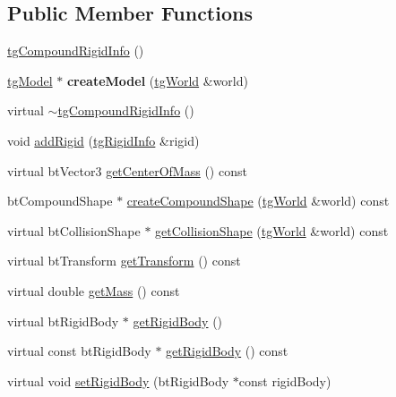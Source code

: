 \subsection*{Public Member Functions}
\begin{DoxyCompactItemize}
\item 
\hyperlink{classtg_compound_rigid_info_aa14e89fb681677147ae38737455cb960}{tg\-Compound\-Rigid\-Info} ()
\item 
\hypertarget{classtg_compound_rigid_info_a74e1206830d6374df6f32ad9cabc7f8f}{\hyperlink{classtg_model}{tg\-Model} $\ast$ {\bfseries create\-Model} (\hyperlink{classtg_world}{tg\-World} \&world)}\label{classtg_compound_rigid_info_a74e1206830d6374df6f32ad9cabc7f8f}

\item 
virtual \hyperlink{classtg_compound_rigid_info_ac926072aeeac41e063cba32014328cda}{$\sim$tg\-Compound\-Rigid\-Info} ()
\item 
void \hyperlink{classtg_compound_rigid_info_a4f908cf4b37888890667c941d7d2fddd}{add\-Rigid} (\hyperlink{classtg_rigid_info}{tg\-Rigid\-Info} \&rigid)
\item 
virtual bt\-Vector3 \hyperlink{classtg_compound_rigid_info_a16b340c7766ee6fd9397bc78170fca27}{get\-Center\-Of\-Mass} () const 
\item 
bt\-Compound\-Shape $\ast$ \hyperlink{classtg_compound_rigid_info_ace1a3d916a35bcac2f45c41293eb9823}{create\-Compound\-Shape} (\hyperlink{classtg_world}{tg\-World} \&world) const 
\item 
virtual bt\-Collision\-Shape $\ast$ \hyperlink{classtg_compound_rigid_info_a184e85ae5d52f42405e6acb80135aa9c}{get\-Collision\-Shape} (\hyperlink{classtg_world}{tg\-World} \&world) const 
\item 
virtual bt\-Transform \hyperlink{classtg_compound_rigid_info_a3e0f704bd270a36d9abbf4b70662daf2}{get\-Transform} () const 
\item 
virtual double \hyperlink{classtg_compound_rigid_info_a2989775971a4723c170c6d8c982f28f8}{get\-Mass} () const 
\item 
virtual bt\-Rigid\-Body $\ast$ \hyperlink{classtg_compound_rigid_info_a910b05d8a902d57d143522b7769114ca}{get\-Rigid\-Body} ()
\item 
virtual const bt\-Rigid\-Body $\ast$ \hyperlink{classtg_compound_rigid_info_a81581bcc603c96ee81fb4d18de7e07d8}{get\-Rigid\-Body} () const 
\item 
virtual void \hyperlink{classtg_compound_rigid_info_a9eab038d880498b14bf0229eca28b933}{set\-Rigid\-Body} (bt\-Rigid\-Body $\ast$const rigid\-Body)

\end{DoxyCompactItemize}

